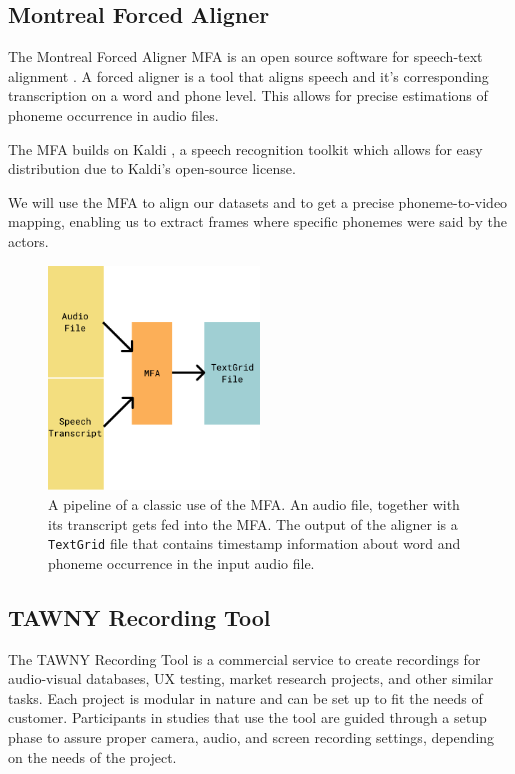 \subsection{Montreal Forced Aligner}
\label{sub:mfa}
The Montreal Forced Aligner MFA is an open source software for speech-text alignment \cite{mcauliffe2017montreal}. A forced aligner is a tool that aligns speech and it's corresponding transcription on a word and phone level. This allows for precise estimations of phoneme occurrence in audio files.

The MFA builds on Kaldi \cite{povey2011kaldi}, a speech recognition toolkit which allows for easy distribution due to Kaldi's open-source license.

We will use the MFA to align our datasets and to get a precise phoneme-to-video mapping, enabling us to extract frames where specific phonemes were said by the actors.

\begin{figure}
    \centering
    \includegraphics[width=0.5\textwidth]{res/mfa.pdf}
    \caption{A pipeline of a classic use of the MFA. An audio file, together with its transcript gets fed into the MFA. The output of the aligner is a \texttt{TextGrid} file that contains timestamp information about word and phoneme occurrence in the input audio file.}
    \label{fig:mfa}
\end{figure}

\subsection{TAWNY Recording Tool}
The TAWNY Recording Tool \cite{tawny2021} is a commercial service to create recordings for audio-visual databases, UX testing, market research projects, and other similar tasks. Each project is modular in nature and can be set up to fit the needs of customer. Participants in studies that use the tool are guided through a setup phase to assure proper camera, audio, and screen recording settings, depending on the needs of the project. 

